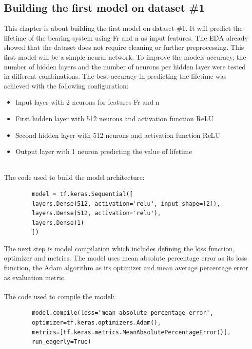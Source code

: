 \documentclass[letterpaper,10pt]{article}
\begin{document}
	
	
	
	
	
	
	
	
	
	
	
	
	
	
	\subsection{Building the first model on dataset \#1}
	This chapter is about building the first model on dataset \#1. It will predict the lifetime of the bearing system using Fr and n as input features. The EDA already showed that the dataset does not require cleaning or further preprocessing.
	\newline This first model will be a simple neural network. To improve the models accuracy, the number of hidden layers and the number of neurons per hidden layer were tested in different combinations. The best accuracy in predicting the lifetime was achieved with the following configuration: 
	\begin{itemize}
		\item Input layer with 2 neurons for features Fr and n
		\item First hidden layer with 512 neurons and activation function ReLU
		\item Second hidden layer with 512 neurons and activation function ReLU
		\item Output layer with 1 neuron predicting the value of lifetime
	\end{itemize} 
	\ \\The code used to build the model architecture:
	\begin{lstlisting}
		model = tf.keras.Sequential([
		layers.Dense(512, activation='relu', input_shape=[2]), 
		layers.Dense(512, activation='relu'),  
		layers.Dense(1)
		])
	\end{lstlisting}
	The next step is model compilation which includes defining the loss function, optimizer and metrics. The model uses mean absolute percentage error as its loss function, the Adam algorithm as its optimizer and mean average percentage error as evaluation metric. 
	\\ \\ The code used to compile the model:
	\begin{lstlisting}
		model.compile(loss='mean_absolute_percentage_error',
		optimizer=tf.keras.optimizers.Adam(),
		metrics=[tf.keras.metrics.MeanAbsolutePercentageError()],
		run_eagerly=True)
	\end{lstlisting}
\end{document}
